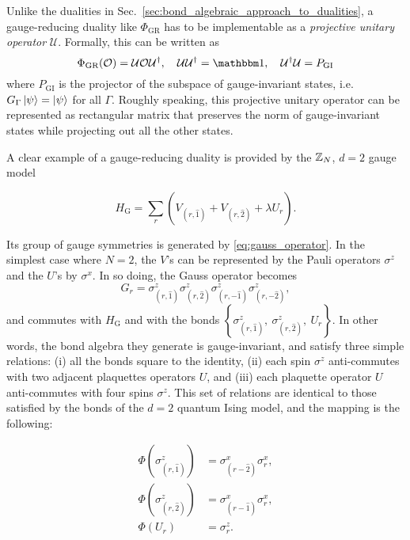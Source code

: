 Unlike the dualities in Sec.~\ref{sec:bond_algebraic_approach_to_dualities}, a gauge-reducing duality like $\Phi_{\text{GR}}$ has to be implementable as a \emph{projective unitary operator} $\mathcal{U}$.
Formally, this can be written as
\begin{equation}
    \Phi_{\text{GR}} ( \mathcal{O} ) = \mathcal{U} \mathcal{O} \mathcal{U}^\dagger, \quad
    \mathcal{U} \mathcal{U}^\dagger = \identity, \quad
    \mathcal{U}^\dagger \mathcal{U} = P_{\text{GI}}
\end{equation}
where $P_{\text{GI}}$ is the projector of the subspace of gauge-invariant states, i.e.~$G_{\Gamma} \ket{\psi} = \ket{\psi}$ for all $\Gamma$.
Roughly speaking, this projective unitary operator can be represented as rectangular matrix that preserves the norm of gauge-invariant states while projecting out all the other states.

A clear example of a gauge-reducing duality is provided by the $\mathbb{Z}_N$, $d=2$ gauge model

\begin{equation}
	H_{\text{G}} = \sum_r \left( V_{(r,\hat{1})} + V_{(r,\hat{2})} + \lambda U_r \right).
\end{equation}

Its group of gauge symmetries is generated by \eqref{eq:gauss_operator}. In the simplest case where $N=2$, the $V$'s can be represented by the Pauli operators $\sigma^z$ and the $U$'s by $\sigma^x$. In so doing, the Gauss operator becomes
\begin{equation}
	G_r =
	\sigma^z_{(r, \hat{1})}
	\sigma^z_{(r, \hat{2})}
	\sigma^z_{(r, -\hat{1})}
	\sigma^z_{(r, -\hat{2})},
	\label{eq:gauss_operator_Z2}
\end{equation}
and commutes with $H_{\text{G}}$ and with the bonds $\left\{\sigma^z_{(r,\hat{1})},\ \sigma^z_{(r,\hat{2})},\ U_r\right\} $.
In other words, the bond algebra they generate is gauge-invariant, and satisfy three simple relations: (i) all the bonds square to the identity, (ii) each spin $\sigma^z$ anti-commutes with two adjacent plaquettes operators $U$, and (iii) each plaquette operator $U$ anti-commutes with four spins $\sigma^z$.
This set of relations are identical to those satisfied by the bonds of the $d=2$ quantum Ising model, and the mapping is the following:

\begin{equation}
    \begin{split}
        \Phi\left( \sigma^z_{(r,\hat{1})} \right) & = \sigma^x_{(r-\hat{2})} \sigma^x_r, \\
        \Phi\left( \sigma^z_{(r,\hat{2})} \right) & = \sigma^x_{(r-\hat{1})} \sigma^x_r, \\
        \Phi(U_r) & = \sigma^z_r.
    \end{split}
    \label{eq:duality_2d}
\end{equation}

